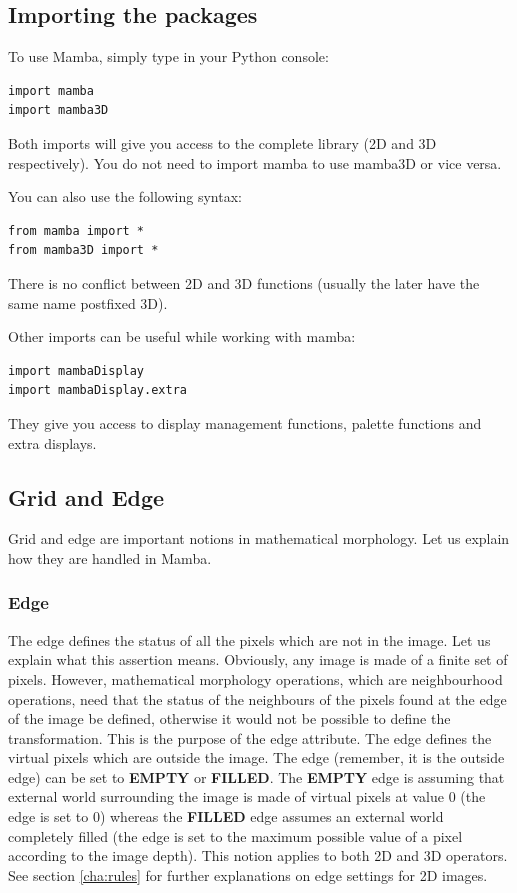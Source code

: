 \documentclass[a4paper,10pt,oneside]{article}
\begin{document}
\subsection{Importing the packages}

To use Mamba, simply type in your Python console:

\lstset{language=Python}
\begin{lstlisting}
import mamba
import mamba3D
\end{lstlisting}

Both imports will give you access to the complete library (2D and 3D respectively).
You do not need to import mamba to use mamba3D or vice versa.

You can also use the following syntax:

\lstset{language=Python}
\begin{lstlisting}
from mamba import *
from mamba3D import *
\end{lstlisting}

There is no conflict between 2D and 3D functions (usually the later have the
same name postfixed 3D).

Other imports can be useful while working with mamba:

\lstset{language=Python}
\begin{lstlisting}
import mambaDisplay
import mambaDisplay.extra
\end{lstlisting}

They give you access to display management functions, palette functions and
extra displays.

\subsection{Grid and Edge}

Grid and edge are important notions in mathematical morphology. Let us explain
how they are handled in Mamba. 

\subsubsection{Edge}

The edge defines the status of all the pixels which are not in the image. Let us 
explain what this assertion means. Obviously, any image is made of a finite set 
of pixels. However, mathematical morphology operations, which are neighbourhood 
operations, need that the status of the neighbours of the pixels found at 
the edge of the image be defined, otherwise it would not be possible to define the 
transformation. This is the purpose of the edge attribute. The edge defines the 
virtual pixels which are outside the image. The edge (remember, it is the outside 
edge) can be set to \textbf{EMPTY} or \textbf{FILLED}. The \textbf{EMPTY} edge
is assuming that external world surrounding 
the image is made of virtual pixels at value 0 (the edge is set to 0) whereas 
the \textbf{FILLED} edge assumes an external world completely filled 
(the edge is set to the maximum possible value of a pixel according to the image 
depth). This notion applies to both 2D and 3D operators. See section \ref{cha:rules} for
further explanations on edge settings for 2D images.
\end{document}
